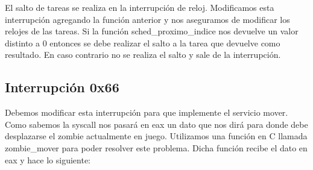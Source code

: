 \documentclass[a4paper]{article}
\begin{document}
El salto de tareas se realiza en la interrupción de reloj. Modificamos esta interrupción agregando la función anterior y nos aseguramos de modificar los relojes de las tareas. Si la función sched\_proximo\_indice nos devuelve un valor distinto a 0 entonces se debe realizar el salto a la tarea que devuelve como resultado. En caso contrario no se realiza el salto y sale de la interrupción. 

\subsection{Interrupción 0x66}

Debemos modificar esta interrupción para que implemente el servicio mover. Como sabemos la syscall nos pasará en eax un dato que nos dirá para donde debe desplazarse el zombie actualmente en juego. Utilizamos una función en C llamada zombie\_mover para poder resolver este problema. Dicha función recibe el dato en eax y hace lo siguiente:
\end{document}
